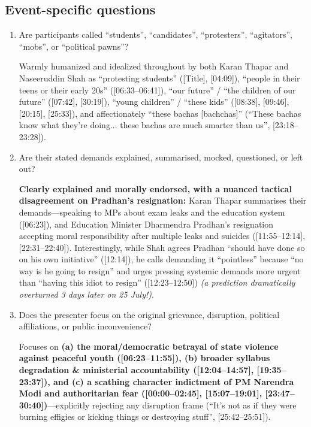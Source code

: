 \documentclass[10pt,a4paper]{article}
\begin{document}
\subsection*{Event-specific questions}
{\small
\begin{enumerate}[leftmargin=1.5em, itemsep=6pt, topsep=4pt]
  \item Are participants called ``students'', ``candidates'', ``protesters'', ``agitators'', ``mobs'', or ``political pawns''?\par\smallskip
  Warmly humanized and idealized throughout by both Karan Thapar and Naseeruddin Shah as ``protesting students'' ([Title], [04:09]), ``people in their teens or their early 20s'' ([06:33--06:41]), ``our future'' / ``the children of our future'' ([07:42], [30:19]), ``young children'' / ``these kids'' ([08:38], [09:46], [20:15], [25:33]), and affectionately ``these bachas [bachchas]'' (``These bachas know what they're doing... these bachas are much smarter than us'', [23:18--23:28]).
  \item Are their stated demands explained, summarised, mocked, questioned, or left out?\par\smallskip
  \textbf{Clearly explained and morally endorsed, with a nuanced tactical disagreement on Pradhan's resignation:} Karan Thapar summarises their demands---speaking to MPs about exam leaks and the education system ([06:23]), and Education Minister Dharmendra Pradhan's resignation accepting moral responsibility after multiple leaks and suicides ([11:55--12:14], [22:31--22:40]). Interestingly, while Shah agrees Pradhan ``should have done so on his own initiative'' ([12:14]), he calls demanding it ``pointless'' because ``no way is he going to resign'' and urges pressing systemic demands more urgent than ``having this idiot to resign'' ([12:23--12:50]) \emph{(a prediction dramatically overturned 3 days later on 25 July!)}.
  \item Does the presenter focus on the original grievance, disruption, political affiliations, or public inconvenience?\par\smallskip
  Focuses on \textbf{(a) the moral/democratic betrayal of state violence against peaceful youth ([06:23--11:55]), (b) broader syllabus degradation \& ministerial accountability ([12:04--14:57], [19:35--23:37]), and (c) a scathing character indictment of PM Narendra Modi and authoritarian fear ([00:00--02:45], [15:07--19:01], [23:47--30:40])}---explicitly rejecting any disruption frame (``It's not as if they were burning effigies or kicking things or destroying stuff'', [25:42--25:51]).

\end{enumerate}}
\end{document}
